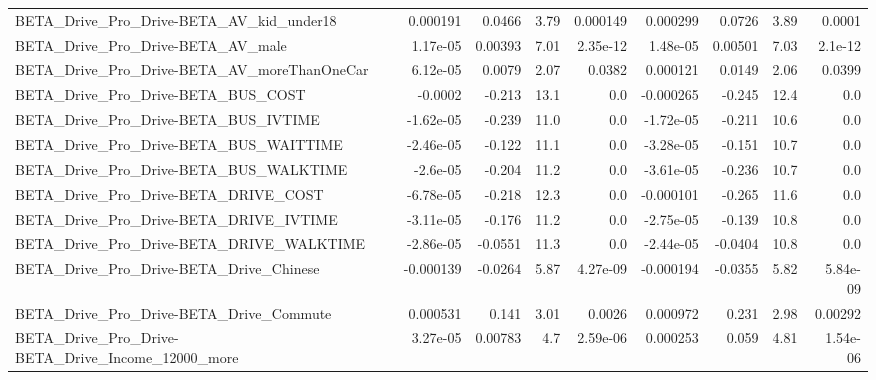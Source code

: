 \begin{tabular}{lrrrrrrrr}
BETA\_Drive\_Pro\_Drive-BETA\_AV\_kid\_under18           &    0.000191 &       0.0466 &     3.79 & 0.000149 &   0.000299 &      0.0726 &         3.89 &        0.0001 \\
BETA\_Drive\_Pro\_Drive-BETA\_AV\_male                  &    1.17e-05 &      0.00393 &     7.01 & 2.35e-12 &   1.48e-05 &     0.00501 &         7.03 &       2.1e-12 \\
BETA\_Drive\_Pro\_Drive-BETA\_AV\_moreThanOneCar        &    6.12e-05 &       0.0079 &     2.07 &   0.0382 &   0.000121 &      0.0149 &         2.06 &        0.0399 \\
BETA\_Drive\_Pro\_Drive-BETA\_BUS\_COST                 &     -0.0002 &       -0.213 &     13.1 &      0.0 &  -0.000265 &      -0.245 &         12.4 &           0.0 \\
BETA\_Drive\_Pro\_Drive-BETA\_BUS\_IVTIME               &   -1.62e-05 &       -0.239 &     11.0 &      0.0 &  -1.72e-05 &      -0.211 &         10.6 &           0.0 \\
BETA\_Drive\_Pro\_Drive-BETA\_BUS\_WAITTIME             &   -2.46e-05 &       -0.122 &     11.1 &      0.0 &  -3.28e-05 &      -0.151 &         10.7 &           0.0 \\
BETA\_Drive\_Pro\_Drive-BETA\_BUS\_WALKTIME             &    -2.6e-05 &       -0.204 &     11.2 &      0.0 &  -3.61e-05 &      -0.236 &         10.7 &           0.0 \\
BETA\_Drive\_Pro\_Drive-BETA\_DRIVE\_COST               &   -6.78e-05 &       -0.218 &     12.3 &      0.0 &  -0.000101 &      -0.265 &         11.6 &           0.0 \\
BETA\_Drive\_Pro\_Drive-BETA\_DRIVE\_IVTIME             &   -3.11e-05 &       -0.176 &     11.2 &      0.0 &  -2.75e-05 &      -0.139 &         10.8 &           0.0 \\
BETA\_Drive\_Pro\_Drive-BETA\_DRIVE\_WALKTIME           &   -2.86e-05 &      -0.0551 &     11.3 &      0.0 &  -2.44e-05 &     -0.0404 &         10.8 &           0.0 \\
BETA\_Drive\_Pro\_Drive-BETA\_Drive\_Chinese            &   -0.000139 &      -0.0264 &     5.87 & 4.27e-09 &  -0.000194 &     -0.0355 &         5.82 &      5.84e-09 \\
BETA\_Drive\_Pro\_Drive-BETA\_Drive\_Commute            &    0.000531 &        0.141 &     3.01 &   0.0026 &   0.000972 &       0.231 &         2.98 &       0.00292 \\
BETA\_Drive\_Pro\_Drive-BETA\_Drive\_Income\_12000\_more  &    3.27e-05 &      0.00783 &      4.7 & 2.59e-06 &   0.000253 &       0.059 &         4.81 &      1.54e-06 \\

\end{tabular}
